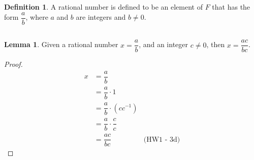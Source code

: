 \documentclass[12pt, letterpaper]{article}
\theoremstyle{definition} %
\newtheorem*{definition}{Definition}
\newtheorem{lemma}{Lemma}[subsection]
\begin{document}
\section{}
\begin{definition}
    A rational number is defined to be an element of $F$ that has the form
    $\dfrac{a}{b}$, where $a$ and $b$ are integers and $b \neq 0$.
\end{definition}
\subsection{}

\begin{lemma}
    Given a rational number $x= \dfrac{a}{b}$, and an integer $c \neq 0$, then
    $x=\dfrac{ac}{bc}$.

    \begin{proof}
        \begin{align*}
            x   &= \dfrac{a}{b} \\
                &= \dfrac{a}{b} \cdot 1 \\
                &= \dfrac{a}{b} \cdot (cc^{-1}) \\
                &= \dfrac{a}{b} \cdot \dfrac{c}{c} \\
                &= \dfrac{ac}{bc}      &\text{(HW1 - 3d)}
        \end{align*}
    \end{proof} 
\end{lemma}
\end{document}

